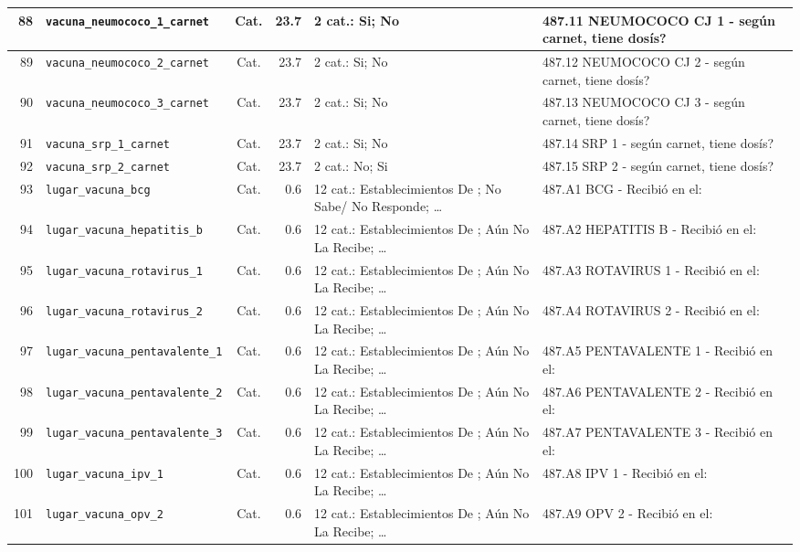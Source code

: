 \begin{longtable}{|r|p{3.1cm}|c|r|p{3.0cm}|p{3.8cm}|}
  88 & \texttt{vacuna\_neumococo\_1\_carnet} & Cat. & 23.7 & 2 cat.: Si; No & 487.11 NEUMOCOCO CJ 1 - según carnet, tiene dosís? \\ \hline
  89 & \texttt{vacuna\_neumococo\_2\_carnet} & Cat. & 23.7 & 2 cat.: Si; No & 487.12 NEUMOCOCO CJ 2 - según carnet, tiene dosís? \\ \hline
  90 & \texttt{vacuna\_neumococo\_3\_carnet} & Cat. & 23.7 & 2 cat.: Si; No & 487.13 NEUMOCOCO CJ 3 - según carnet, tiene dosís? \\ \hline
  91 & \texttt{vacuna\_srp\_1\_carnet} & Cat. & 23.7 & 2 cat.: Si; No & 487.14 SRP 1 - según carnet, tiene dosís? \\ \hline
  92 & \texttt{vacuna\_srp\_2\_carnet} & Cat. & 23.7 & 2 cat.: No; Si & 487.15 SRP 2 - según carnet, tiene dosís? \\ \hline
  93 & \texttt{lugar\_vacuna\_bcg} & Cat. & 0.6 & 12 cat.: Establecimientos De ; No Sabe/ No Responde; … & 487.A1 BCG - Recibió en el: \\ \hline
  94 & \texttt{lugar\_vacuna\_hepatitis\_b} & Cat. & 0.6 & 12 cat.: Establecimientos De ; Aún No La Recibe; … & 487.A2 HEPATITIS B - Recibió en el: \\ \hline
  95 & \texttt{lugar\_vacuna\_rotavirus\_1} & Cat. & 0.6 & 12 cat.: Establecimientos De ; Aún No La Recibe; … & 487.A3 ROTAVIRUS 1 - Recibió en el: \\ \hline
  96 & \texttt{lugar\_vacuna\_rotavirus\_2} & Cat. & 0.6 & 12 cat.: Establecimientos De ; Aún No La Recibe; … & 487.A4 ROTAVIRUS 2 - Recibió en el: \\ \hline
  97 & \texttt{lugar\_vacuna\_pentavalente\_1} & Cat. & 0.6 & 12 cat.: Establecimientos De ; Aún No La Recibe; … & 487.A5 PENTAVALENTE 1 - Recibió en el: \\ \hline
  98 & \texttt{lugar\_vacuna\_pentavalente\_2} & Cat. & 0.6 & 12 cat.: Establecimientos De ; Aún No La Recibe; … & 487.A6 PENTAVALENTE 2 - Recibió en el: \\ \hline
  99 & \texttt{lugar\_vacuna\_pentavalente\_3} & Cat. & 0.6 & 12 cat.: Establecimientos De ; Aún No La Recibe; … & 487.A7 PENTAVALENTE 3 - Recibió en el: \\ \hline
  100 & \texttt{lugar\_vacuna\_ipv\_1} & Cat. & 0.6 & 12 cat.: Establecimientos De ; Aún No La Recibe; … & 487.A8 IPV 1 - Recibió en el: \\ \hline
  101 & \texttt{lugar\_vacuna\_opv\_2} & Cat. & 0.6 & 12 cat.: Establecimientos De ; Aún No La Recibe; … & 487.A9 OPV 2 - Recibió en el: \\ \hline

\end{longtable}

